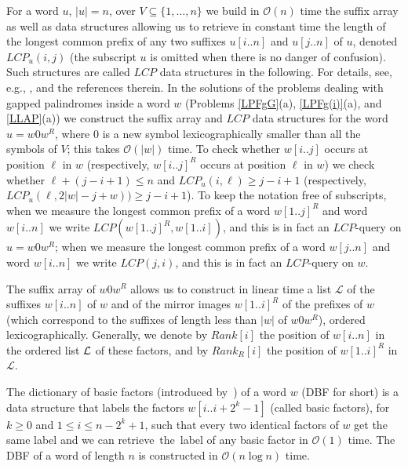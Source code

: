 \documentclass[final]{dmtcs-episciences}
\newcommand{\bigo}{{\mathcal O}}
\newcommand{\LCP}{{\mathit{LCP}}}
\begin{document}
For a word $u$, $|u|=n$, over $V\subseteq \{1,\ldots,n\}$ we build in $\bigo(n)$ time the suffix array as well as data structures allowing us to retrieve in constant time the length of the longest common prefix of any two suffixes $u[i..n]$ and $u[j..n]$
of $u$, denoted $\LCP_u(i,j)$ (the subscript $u$ is omitted when there is no danger of confusion). Such structures are called $\LCP$ data structures in the following. For details, see, e.g., \cite{KaSaBu06,Gu97}, and the references therein. In the solutions of the problems dealing with gapped palindromes inside a word $w$ (Problems \ref{LPFgG}(a), \ref{LPFg(i)}(a), and \ref{LLAP}(a)) we construct the suffix array and $\LCP$ data structures for 
the word $u=w0w^R$, where $0$ is a new symbol lexicographically smaller than all the symbols of $V$; this takes $\bigo(|w|)$ time. To check whether $w[i..j]$ occurs at position $\ell$ in $w$ (respectively, $w[i..j]^R$ occurs at position $\ell$ in $w$) we check whether $\ell+(j-i+1)\leq n$ and $LCP_u(i,\ell)\geq j-i+1$ (respectively, $\LCP_u(\ell,2|w|-j+w))\geq j-i+1$). To keep the notation free of subscripts, when we measure the longest common prefix of a word $w[1..j]^R$ and word $w[i..n]$ we write $\LCP(w[1..j]^R,w[1..i])$, and this is in fact an $\LCP$-query on $u=w0w^R$; when we measure the longest common prefix of a word $w[j..n]$ and word $w[i..n]$ we write $\LCP(j,i)$, and this is in fact an $\LCP$-query on $w$.

The suffix array of $w0w^R$ allows us to construct in linear time a list ${\mathcal L}$ of the suffixes $w[i..n]$ of $w$ and of the mirror images $w[1..i]^R$ of the prefixes of $w$ (which correspond to the suffixes of length less than $|w|$ of $w0w^R$), ordered lexicographically. Generally, we denote by $Rank[i]$ the position of $w[i..n]$ in the ordered list ${\cal L}$ of these factors, and by $Rank_R[i]$ the position of $w[1..i]^R$ in ${\mathcal L}$. 

The dictionary of basic factors (introduced by~\cite{DBF}) of a word $w$ (DBF for short) is a data structure that labels the factors $w[i..i+2^k-1]$ (called basic factors), for $k\geq 0$ and $1\leq i\leq n-2^k+1$, such that every two identical factors of $w$ get the same label and we can retrieve~the~label of any basic factor in $\bigo(1)$ time. The DBF of a word of length $n$ is constructed in $\bigo(n\log n)$ time. 
\end{document}
